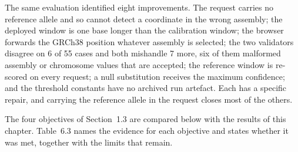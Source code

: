 The same evaluation identified eight improvements. The request carries no reference allele and so cannot detect a coordinate in the wrong assembly; the deployed window is one base longer than the calibration window; the browser forwards the GRCh38 position whatever assembly is selected; the two validators disagree on 6 of 55 cases and both mishandle 7 more, six of them malformed assembly or chromosome values that are accepted; the reference window is re-scored on every request; a null substitution receives the maximum confidence; and the threshold constants have no archived run artefact. Each has a specific repair, and carrying the reference allele in the request closes most of the others.

\vspace{8pt}
The four objectives of Section~1.3 are compared below with the results of this chapter. Table~6.3 names the evidence for each objective and states whether it was met, together with the limits that remain.

